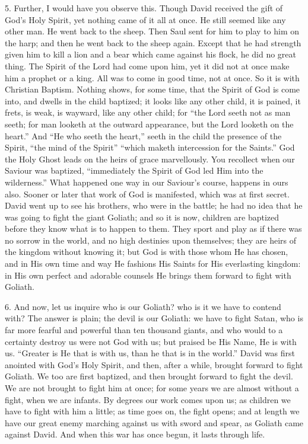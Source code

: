 5. Further, I would have you observe this. Though David received
the gift of God's Holy Spirit, yet nothing came of it all at once. He
still seemed like any other man. He went back to the sheep. Then Saul
sent for him to play to him on the harp; and then he went back to the
sheep again. Except that he had strength given him to kill a lion and
a bear which came against his flock, he did no great thing. The Spirit
of the Lord had come upon him, yet it did not at once make him a
prophet or a king. All was to come in good time, not at once. So it is
with Christian Baptism. Nothing shows, for some time, that the Spirit
of God is come into, and dwells in the child baptized; it looks like
any other child, it is pained, it frets, is weak, is wayward, like any
other child; for ``the Lord seeth not as man seeth; for man
looketh at the outward appearance, but the Lord looketh on the
heart.'' And ``He who seeth the heart,'' seeth in the
child the presence of the Spirit, ``the mind of the Spirit''
``which maketh intercession for the Saints.'' God the Holy
Ghost leads on the heirs of grace marvellously. You recollect when our
Saviour was baptized, ``immediately the Spirit of God led Him into
the wilderness.'' What happened one way in our Saviour's course,
happens in ours also. Sooner or later that work of God is manifested,
which was at first secret. David went up to see his brothers, who were
in the battle; he had no idea that he was going to fight the giant
Goliath; and so it is now, children are baptized before they know what
is to happen to them. They sport and play as if there was no sorrow in
the world, and no high destinies upon themselves; they are heirs of
the kingdom without knowing it; but God is with those whom He has
chosen, and in His own time and way He fashions His Saints for His
everlasting kingdom: in His own perfect and adorable counsels He
brings them forward to fight with Goliath.

6. And now, let us inquire who is our Goliath? who is it we have to
contend with? The answer is plain; the devil is our Goliath: we have
to fight Satan, who is far more fearful and powerful than ten thousand
giants, and who would to a certainty destroy us were not God with us;
but praised be His Name, He is with us. ``Greater is He that is
with us, than he that is in the world.'' David was first anointed
with God's Holy Spirit, and then, after a while, brought forward to
fight Goliath. We too are first baptized, and then brought forward to
fight the devil. We are not brought to fight him at once; for some
years we are almost without a fight, when we are infants. By degrees
our work comes upon us; as children we have to fight with him a
little; as time goes on, the fight opens; and at length we have our
great enemy marching against us with sword and spear, as Goliath came
against David. And when this war has once begun, it lasts through
life.

